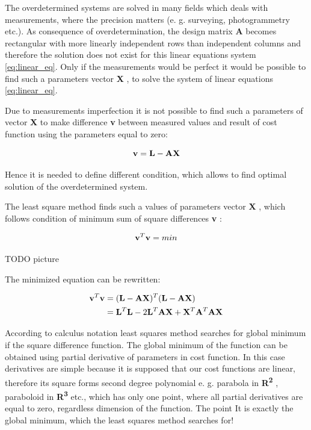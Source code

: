 \documentclass[a4paper,12pt]{article}
\newcommand{\ematr}[1]{
{\bf #1}
}
\newcommand{\evect}[1]{
{\bf #1}
}
\newcommand{\eucl}[1]{
{\bf R\textsuperscript{#1}}
}
\begin{document}
The overdetermined systems are solved in many fields which deals with measurements, where the precision matters (e. g. 
surveying, photogrammetry etc.).
As consequence of overdetermination, the design matrix \ematr{A} becomes rectangular with more linearly independent rows than independent columns 
and therefore the solution does not exist for this linear equations system \eqref{eq:linear_eq}.
Only if the measurements would be perfect it would be possible to find such a parameters vector \evect{X}, to 
solve the system of linear equations \eqref{eq:linear_eq}. 

Due to measurements imperfection it is not possible to find such a parameters of vector \evect{X} to make difference \evect{v} between measured values and 
result of cost function using the parameters equal to zero:

\begin{equation}
\label{eq:least_v}
\evect{v} = \evect{L} - \ematr{A}\evect{X}
\end{equation} 



Hence it is needed to define different condition, which allows to find optimal solution of the 
overdetermined system.

The least square method finds such a values of parameters vector \evect{X}, which 
follows condition of minimum sum of square differences \evect{v}: 

\begin{equation}
\evect{v}^{T} \evect{v} = min
\end{equation} 

TODO picture

The minimized equation can be rewritten:

\begin{equation}
\begin{split}
\evect{v}^{T} \evect{v} &= (\evect{L} - \ematr{A}\ematr{X})^{T} (\evect{L} - \ematr{A}\ematr{X}) \\
&= \evect{L}^{T} \evect{L} - 2 \evect{L}^{T} \ematr{A} \evect{X} + \evect{X}^{T} \ematr{A}^{T} \ematr{A} \evect{X}
\label{eq:least_be_part}
\end{split}
\end{equation} 

According to calculus notation least squares method searches for global minimum if the square difference function. 
The global minimum of the function can be obtained using partial derivative of parameters in cost function.
In this case derivatives are simple because it is supposed that our cost functions are linear, therefore 
its square forms  second degree polynomial e. g. parabola in \eucl{2}, paraboloid in \eucl{3} etc., which has
only one point, where all partial derivatives are equal to zero, regardless dimension of the function. The point It is 
exactly the global minimum, which the least squares method searches for!
\end{document}
